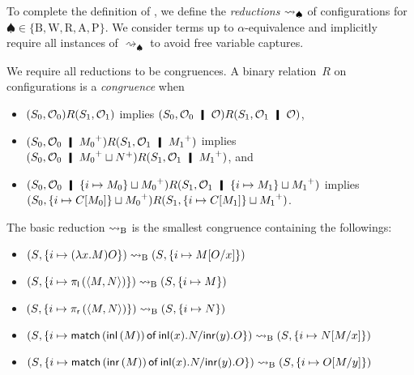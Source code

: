 To complete the definition of \lgd,
 we define the \textit{reductions} $\rightsquigarrow_\spadesuit$ of
 configurations for $\spadesuit\in\{\mathrm B, \mathrm W, \mathrm R, \mathrm A,
 \mathrm P\}$.
 We consider terms up to $\alpha$-equivalence and implicitly
 require all instances
 of $\rightsquigarrow_\spadesuit$ to avoid free variable captures.

We require all reductions to be congruences.
A binary relation~$R$ on configurations is a \textit{congruence}
when 
\begin{itemize}
 \item $({S_0},{\mathcal{O}_0}) R ({S_1},{\mathcal{O}_1})$ implies
       $\concreteconf{S_0}{\hypert_0\hmid \hypert} R
       \concreteconf{S_1}{\hypert_1\hmid \hypert}$,
 \item $\concreteconf{S_0}{\hypert_0\hmid \m{M_0}} R
       \concreteconf{S_1}{\hypert_1 \hmid \m{M_1}}$ implies
       $\concreteconf{S_0}{\hypert_0\hmid \m{M_0}\sqcup \m{N}} R
       \concreteconf{S_1}{\hypert_1\hmid \m{M_1}}$, and
 \item $\concreteconf{S_0}{\hypert_0\hmid \{i\mapsto M_0\}\sqcup
       \m{M_0}} R \concreteconf{S_1}{\hypert_1\hmid \imapsto{M_1}\sqcup
       \m{M_1}}$ implies
       $({S_0},{\{i\mapsto {C[M_0]}\}\sqcup {M_0}^+}) R
       ({S_1},{\{i\mapsto {C[M_1]}\}\sqcup {M_1}^+})$.
\end{itemize}

\begin{definition}
 The basic reduction $\rightsquigarrow_{\mathrm B}$ is the smallest congruence containing
 the followings:
 \begin{itemize}
  \item  $({S}{},{\{i\mapsto {(\lambda x.M)O}\}})\rightsquigarrow_{\mathrm B}
	 ({S}{},{\{i\mapsto {M[O/x]}\}})$
  \item $({S}{},{\{i\mapsto {\pi_{\mathsf l}\left({\langle{M,N}\rangle}\right)}\}}) \rightsquigarrow_{\mathrm B}
	 ({S}{},{           \{i\mapsto {M}\}   })$
  \item $({S}{},{\{i\mapsto {\pi_{\mathsf r}\left({\langle{M,N}\rangle}\right)}\}}) \rightsquigarrow_{\mathrm B}
	 ({S}{},{             \{i\mapsto {N}\} })$
  \item $({S}{},{\{i\mapsto {\mathsf{match}\,{(\mathsf{inl}\left({M}\right))}\,\mathsf{of}\, \mathsf{inl}({x}). {N}/ \mathsf{inr}({y}). {O}}\}}) \rightsquigarrow_{\mathrm B}
	 ({S}{},{              \{i\mapsto {N[M/x]}\}})$
  \item $({S}{},{\{i\mapsto {\mathsf{match}\,{(\mathsf{inr}\left({M}\right))}\,\mathsf{of}\, \mathsf{inl}({x}). {N}/ \mathsf{inr}({y}). {O}}\}}) \rightsquigarrow_{\mathrm B}
	 ({S}{},{                  \{i\mapsto {O[M/y]}\}})$
 \end{itemize}
\end{definition}

